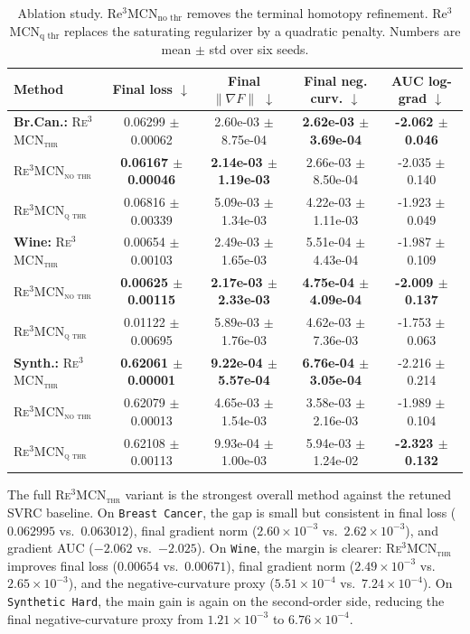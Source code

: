 \documentclass{article}
\theoremstyle{plain}
\theoremstyle{definition}
\theoremstyle{remark}
\begin{document}
\begin{table}[ht!]
\centering
\small
\setlength{\tabcolsep}{5pt}
\begin{tabular}{lcccc}
\toprule
Method & Final loss $\downarrow$ & Final $\|\nabla F\|$ $\downarrow$ & Final neg. curv. $\downarrow$ & AUC log-grad $\downarrow$ \\
\midrule
\textbf{Br.Can.:} \textsc{Re$^3$MCN$_{\text{thr}}$} & 0.06299 $\pm$ 0.00062 & 2.60e-03 $\pm$ 8.75e-04 & \textbf{2.62e-03 $\pm$ 3.69e-04} & \textbf{-2.062 $\pm$ 0.046}\\
\textsc{Re$^3$MCN$_{\text{no thr}}$} & \textbf{0.06167 $\pm$ 0.00046} & \textbf{2.14e-03 $\pm$ 1.19e-03} & 2.66e-03 $\pm$ 8.50e-04 & -2.035 $\pm$ 0.140\\
\textsc{Re$^3$MCN$_{\text{q thr}}$} & 0.06816 $\pm$ 0.00339 & 5.09e-03 $\pm$ 1.34e-03 & 4.22e-03 $\pm$ 1.11e-03 & -1.923 $\pm$ 0.049\\
\midrule
\textbf{Wine:} \textsc{Re$^3$MCN$_{\text{thr}}$} & 0.00654 $\pm$ 0.00103 & 2.49e-03 $\pm$ 1.65e-03 & 5.51e-04 $\pm$ 4.43e-04 & -1.987 $\pm$ 0.109\\
\textsc{Re$^3$MCN$_{\text{no thr}}$} & \textbf{0.00625 $\pm$ 0.00115} & \textbf{2.17e-03 $\pm$ 2.33e-03} & \textbf{4.75e-04 $\pm$ 4.09e-04} & \textbf{-2.009 $\pm$ 0.137}\\
\textsc{Re$^3$MCN$_{\text{q thr}}$} & 0.01122 $\pm$ 0.00695 & 5.89e-03 $\pm$ 1.76e-03 & 4.62e-03 $\pm$ 7.36e-03 & -1.753 $\pm$ 0.063\\
\midrule
\textbf{Synth.:} \textsc{Re$^3$MCN$_{\text{thr}}$} & \textbf{0.62061 $\pm$ 0.00001} & \textbf{9.22e-04 $\pm$ 5.57e-04} & \textbf{6.76e-04 $\pm$ 3.05e-04} & -2.216 $\pm$ 0.214\\
\textsc{Re$^3$MCN$_{\text{no thr}}$} & 0.62079 $\pm$ 0.00013 & 4.65e-03 $\pm$ 1.54e-03 & 3.58e-03 $\pm$ 2.16e-03 & -1.989 $\pm$ 0.104\\
\textsc{Re$^3$MCN$_{\text{q thr}}$} & 0.62108 $\pm$ 0.00113 & 9.93e-04 $\pm$ 1.00e-03 & 5.94e-03 $\pm$ 1.24e-02 & \textbf{-2.323 $\pm$ 0.132}\\
\bottomrule
\end{tabular}
\caption{Ablation study. Re$^3$MCN$_{\text{no thr}}$ removes the terminal homotopy refinement. Re$^3$MCN$_{\text{q thr}}$ replaces the saturating regularizer by a quadratic penalty. Numbers are mean $\pm$ std over six seeds.}
\label{tab:re3mcn_ablations}
\end{table}


The full \textsc{Re$^3$MCN$_{\text{thr}}$} variant is the strongest overall method against the retuned \textsc{SVRC} baseline. On \texttt{Breast Cancer}, the gap is small but consistent in final loss ($0.062995$ vs.~$0.063012$), final gradient norm ($2.60\times 10^{-3}$ vs.~$2.62\times 10^{-3}$), and gradient AUC ($-2.062$ vs.~$-2.025$). On \texttt{Wine}, the margin is clearer: \textsc{Re$^3$MCN$_{\text{thr}}$} improves final loss ($0.00654$ vs.~$0.00671$), final gradient norm ($2.49\times 10^{-3}$ vs.~$2.65\times 10^{-3}$), and the negative-curvature proxy ($5.51\times 10^{-4}$ vs.~$7.24\times 10^{-4}$). On \texttt{Synthetic Hard}, the main gain is again on the second-order side, reducing the final negative-curvature proxy from $1.21\times 10^{-3}$ to $6.76\times 10^{-4}$.
\end{document}
